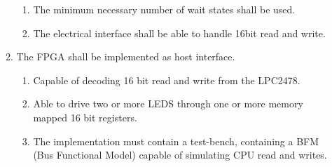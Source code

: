 \documentclass[12pt,a4paper]{report}
\begin{document}
\begin{enumerate}
\begin{enumerate}
\begin{enumerate}
		\item The minimum necessary number of wait states shall be used.
		\item The electrical interface shall be able to handle 16bit read and write.
	\end{enumerate}
	\item The FPGA shall be implemented as host interface.
	\begin{enumerate}
		\item Capable of decoding 16 bit read and write from the LPC2478.
		\item Able to drive two or more LEDS through one or more memory mapped 16 bit registers.
		\item The implementation must contain a test-bench, containing a BFM (Bus Functional Model) capable of simulating CPU read and writes.
	\end{enumerate}
\end{enumerate}
\end{enumerate}
\end{document}
